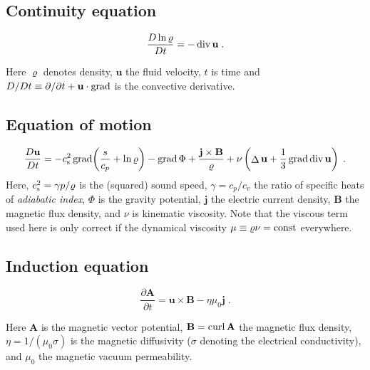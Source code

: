 \documentclass[12pt,twoside,notitlepage,a4paper]{article}
\newcommand{\grad}    {\mathop{\rm grad}\nolimits}
\newcommand{\Div}     {\mathop{\rm div}\nolimits}
\newcommand{\curl}    {\mathop{\rm curl}\nolimits}
\newcommand{\Laplace} {\mathop{\Delta}\nolimits}
\newcommand{\vekt}[1] {\mathbf{#1}}
\newcommand{\const}   {\mbox{\rm const}}
\newcommand{\Av}            {\vekt{A}}
\newcommand{\Bv}            {\vekt{B}}
\newcommand{\cs}            {c_{\rm s}}
\newcommand{\jv}            {\vekt{j}}
\newcommand{\uv}            {\vekt{u}}
\begin{document}
\subsection{Continuity equation}

\begin{equation}
  \frac{D\ln\varrho}{Dt}
  = - \Div\uv \; .
\end{equation}

Here $\varrho$ denotes density, $\uv$ the fluid velocity, $t$ is time and
$D/Dt \equiv \partial/\partial t + \uv\cdot\grad$ is the convective
derivative.


\subsection{Equation of motion}

\begin{equation}
  \frac{D\uv}{Dt}
   =  -\cs^2\grad\biggl(\frac{s}{c_p} + \ln\varrho\biggr)
      - \grad\Phi
      + \frac{\jv\times\Bv}{\varrho}
      + \nu \left( \Laplace\uv + \frac{1}{3}\grad\Div\uv \right) \; .
\end{equation}
Here, $\cs^2 = \gamma p/\varrho$ is the (squared) sound speed,
$\gamma=c_p/c_v$ the ratio of specific heats of \emph{adiabatic index},
$\Phi$ is the gravity potential, $\jv$ the electric current density, $\Bv$
the magnetic flux density, and $\nu$ is kinematic viscosity.
Note that the viscous term used here is only correct if the dynamical
viscosity $\mu \equiv \varrho\nu = \const$ everywhere.


\subsection{Induction equation}

\begin{equation}
  \frac{\partial\Av}{\partial t}
  = \uv\times\Bv - \eta\mu_0\jv \; .
\end{equation}

Here $\Av$ is the magnetic vector potential, $\Bv = \curl\Av$ the magnetic
flux density, $\eta = 1/(\mu_0\sigma)$ is the magnetic diffusivity
($\sigma$ denoting the electrical conductivity), and $\mu_0$ the
magnetic vacuum permeability.


\end{document}
